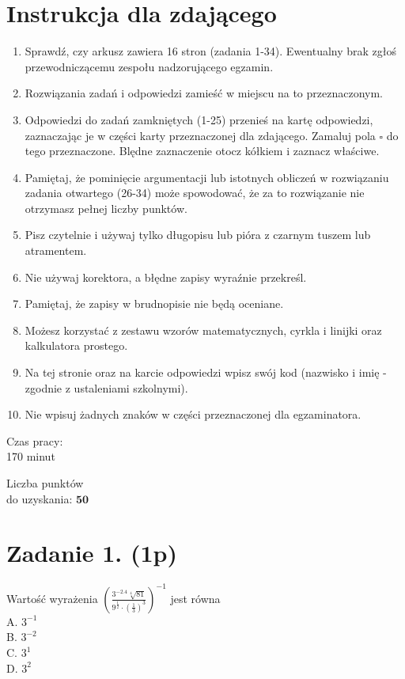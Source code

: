\documentclass[10pt]{article}
\begin{document}
\section*{Instrukcja dla zdającego}
\begin{enumerate}
  \item Sprawdź, czy arkusz zawiera 16 stron (zadania 1-34). Ewentualny brak zgłoś przewodniczącemu zespołu nadzorującego egzamin.
  \item Rozwiązania zadań i odpowiedzi zamieść w miejscu na to przeznaczonym.
  \item Odpowiedzi do zadań zamkniętych (1-25) przenieś na kartę odpowiedzi, zaznaczając je w części karty przeznaczonej dla zdającego. Zamaluj pola \(\square\) do tego przeznaczone. Blędne zaznaczenie otocz kółkiem i zaznacz właściwe.
  \item Pamiętaj, że pominięcie argumentacji lub istotnych obliczeń w rozwiązaniu zadania otwartego (26-34) może spowodować, że za to rozwiązanie nie otrzymasz pełnej liczby punktów.
  \item Pisz czytelnie i używaj tylko długopisu lub pióra z czarnym tuszem lub atramentem.
  \item Nie używaj korektora, a błędne zapisy wyraźnie przekreśl.
  \item Pamiętaj, że zapisy w brudnopisie nie będą oceniane.
  \item Możesz korzystać z zestawu wzorów matematycznych, cyrkla i linijki oraz kalkulatora prostego.
  \item Na tej stronie oraz na karcie odpowiedzi wpisz swój kod (nazwisko i imię - zgodnie z ustaleniami szkolnymi).
  \item Nie wpisuj żadnych znaków w części przeznaczonej dla egzaminatora.
\end{enumerate}

Czas pracy:\\
170 minut

Liczba punktów\\
do uzyskania: \(\mathbf{5 0}\)

\section*{Zadanie 1. (1p)}
Wartość wyrażenia \(\left(\frac{3^{-2.4} \sqrt[4]{81}}{9^{\frac{1}{2}} \cdot\left(\frac{1}{3}\right)^{3}}\right)^{-1}\) jest równa\\
A. \(3^{-1}\)\\
B. \(3^{-2}\)\\
C. \(3^{1}\)\\
D. \(3^{2}\)
\end{document}
